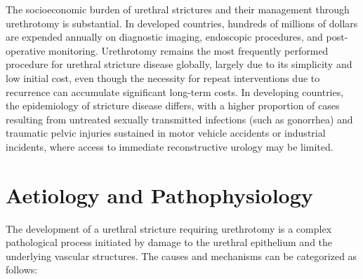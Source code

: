 The socioeconomic burden of urethral strictures and their management through urethrotomy is substantial. In developed countries, hundreds of millions of dollars are expended annually on diagnostic imaging, endoscopic procedures, and post-operative monitoring. Urethrotomy remains the most frequently performed procedure for urethral stricture disease globally, largely due to its simplicity and low initial cost, even though the necessity for repeat interventions due to recurrence can accumulate significant long-term costs. In developing countries, the epidemiology of stricture disease differs, with a higher proportion of cases resulting from untreated sexually transmitted infections (such as gonorrhea) and traumatic pelvic injuries sustained in motor vehicle accidents or industrial incidents, where access to immediate reconstructive urology may be limited.

\section*{Aetiology and Pathophysiology}
The development of a urethral stricture requiring urethrotomy is a complex pathological process initiated by damage to the urethral epithelium and the underlying vascular structures. The causes and mechanisms can be categorized as follows:

